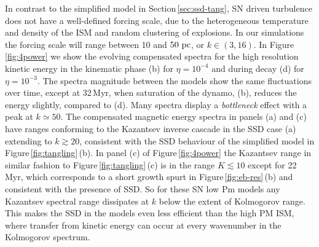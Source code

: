 \documentclass[preprint2]{aastex63}
\newcommand\pc{~ {\rm pc}}
\begin{document}
In contrast to the simplified model in Section\,\ref{sec:ssd-tang}, SN driven
turbulence does not have a well-defined forcing scale, due to the heterogeneous
temperature and density of the ISM and random clustering of explosions.
In our simulations the forcing scale will range between
10 and $50\pc$,
or $k\in(3,16)$.
In Figure\,\ref{fig:4power} we show the evolving compensated spectra for the
high resolution kinetic energy in the kinematic phase (b) for $\eta=10^{-4}$
and during decay (d) for $\eta=10^{-3}$.
The spectra magnitude between the models show the same fluctuations over time,
except at 32\,Myr, when saturation of the dynamo, (b), reduces
the energy slightly, compared to (d). 
Many spectra display a \emph{bottleneck} effect
\citep{Falkovich94,HBD03} with a peak at $k\simeq50$.
The compensated magnetic energy spectra in panels (a) and (c) have ranges 
conforming to the Kazantsev inverse cascade in the SSD case (a) extending to
$k\gtrsim 20$, consistent with the SSD behaviour of the simplified model in
Figure\,\ref{fig:tangling}\,(b).
In panel (c) of Figure\,\ref{fig:4power} the Kazantsev range in similar fashion
to Figure\,\ref{fig:tangling}\,(c) is in the range 
$K\lesssim10$ except
for 22\,Myr, which corresponds to a short growth spurt in
Figure\,\ref{fig:eb-res}\,(b) and consistent with the presence of SSD.
So for these SN low Pm models any Kazantsev spectral range dissipates 
at $k$ below the extent of Kolmogorov range.
This makes the SSD in the models even less efficient 
than the high PM ISM,
where transfer from kinetic energy can occur at every wavenumber in the
Kolmogorov spectrum.
\end{document}
